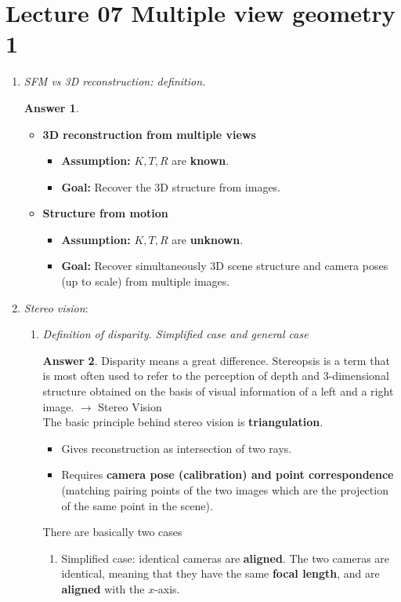 \documentclass[a4paper,12 pt]{article}
\theoremstyle{definition}
\theoremstyle{remark}
\theoremstyle{definition}
\theoremstyle{definition}
\theoremstyle{definition}
\theoremstyle{definition}
\theoremstyle{remark}
\theoremstyle{remark}
\theoremstyle{definition}
\theoremstyle{definition}
\newtheorem*{answer}{Answer}
\begin{document}
\section*{Lecture 07 Multiple view geometry 1}
\begin{enumerate}
\item \textit{SFM vs 3D reconstruction: definition.}
\begin{answer}
\
\begin{itemize}
\item \textbf{3D reconstruction from multiple views}
\begin{itemize}
\item \textbf{Assumption:} $K,T,R$ are \textbf{known}.
\item \textbf{Goal:} Recover the 3D structure from images.
\end{itemize}
\item \textbf{Structure from motion}
\begin{itemize}
\item \textbf{Assumption:} $K,T,R$ are \textbf{unknown}.
\item \textbf{Goal:} Recover simultaneously 3D scene structure and camera poses (up to scale) from multiple images.
\end{itemize}
\end{itemize}
\end{answer}
\item \textit{Stereo vision}:
\begin{enumerate}
\item \textit{Definition of disparity. Simplified case and general case}
\begin{answer}
Disparity means a great difference. Stereopsis is a term that is most often used to refer to the perception of depth and 3-dimensional structure obtained on the basis of visual information of a left and a right image.  $\rightarrow$ Stereo Vision\\
The basic principle behind stereo vision is \textbf{triangulation}.
\begin{itemize}
\item Gives reconstruction as intersection of two rays.
\item Requires \textbf{camera pose (calibration) and point correspondence} (matching pairing points of the two images which are the projection of the same point in the scene).
\end{itemize}
There are basically two cases
\begin{enumerate}
\item Simplified case: identical cameras are \textbf{aligned}. The two cameras are identical, meaning that they have the same \textbf{focal length}, and are \textbf{aligned} with the $x$-axis. 

\end{enumerate}
\end{answer}
\end{enumerate}
\end{enumerate}
\end{document}
